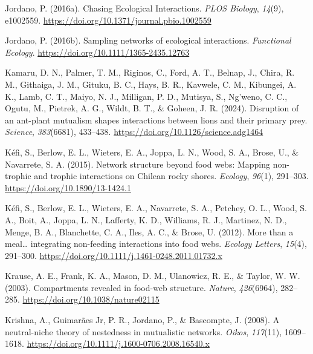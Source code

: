 \documentclass[
]{article}
\newlength{\cslhangindent}
\newenvironment{CSLReferences}[2] %
 {\begin{list}{}{%
  \setlength{\itemindent}{0pt}
  \setlength{\leftmargin}{0pt}
  \setlength{\parsep}{0pt}
  \ifodd #1
   \setlength{\leftmargin}{\cslhangindent}
   \setlength{\itemindent}{-1\cslhangindent}
  \fi
  \setlength{\itemsep}{#2\baselineskip}}}
 {\end{list}}
\begin{document}
\begin{CSLReferences}{1}{0}
Jordano, P. (2016a). Chasing {Ecological Interactions}. \emph{PLOS
Biology}, \emph{14}(9), e1002559.
\url{https://doi.org/10.1371/journal.pbio.1002559}

Jordano, P. (2016b). Sampling networks of ecological interactions.
\emph{Functional Ecology}. \url{https://doi.org/10.1111/1365-2435.12763}

Kamaru, D. N., Palmer, T. M., Riginos, C., Ford, A. T., Belnap, J.,
Chira, R. M., Githaiga, J. M., Gituku, B. C., Hays, B. R., Kavwele, C.
M., Kibungei, A. K., Lamb, C. T., Maiyo, N. J., Milligan, P. D.,
Mutisya, S., Ng'weno, C. C., Ogutu, M., Pietrek, A. G., Wildt, B. T., \&
Goheen, J. R. (2024). Disruption of an ant-plant mutualism shapes
interactions between lions and their primary prey. \emph{Science},
\emph{383}(6681), 433--438.
\url{https://doi.org/10.1126/science.adg1464}

Kéfi, S., Berlow, E. L., Wieters, E. A., Joppa, L. N., Wood, S. A.,
Brose, U., \& Navarrete, S. A. (2015). Network structure beyond food
webs: Mapping non-trophic and trophic interactions on {Chilean} rocky
shores. \emph{Ecology}, \emph{96}(1), 291--303.
\url{https://doi.org/10.1890/13-1424.1}

Kéfi, S., Berlow, E. L., Wieters, E. A., Navarrete, S. A., Petchey, O.
L., Wood, S. A., Boit, A., Joppa, L. N., Lafferty, K. D., Williams, R.
J., Martinez, N. D., Menge, B. A., Blanchette, C. A., Iles, A. C., \&
Brose, U. (2012). More than a meal{\ldots{}} integrating non-feeding
interactions into food webs. \emph{Ecology Letters}, \emph{15}(4),
291--300. \url{https://doi.org/10.1111/j.1461-0248.2011.01732.x}

Krause, A. E., Frank, K. A., Mason, D. M., Ulanowicz, R. E., \& Taylor,
W. W. (2003). Compartments revealed in food-web structure.
\emph{Nature}, \emph{426}(6964), 282--285.
\url{https://doi.org/10.1038/nature02115}

Krishna, A., Guimarães Jr, P. R., Jordano, P., \& Bascompte, J. (2008).
A neutral-niche theory of nestedness in mutualistic networks.
\emph{Oikos}, \emph{117}(11), 1609--1618.
\url{https://doi.org/10.1111/j.1600-0706.2008.16540.x}


\end{CSLReferences}
\end{document}
